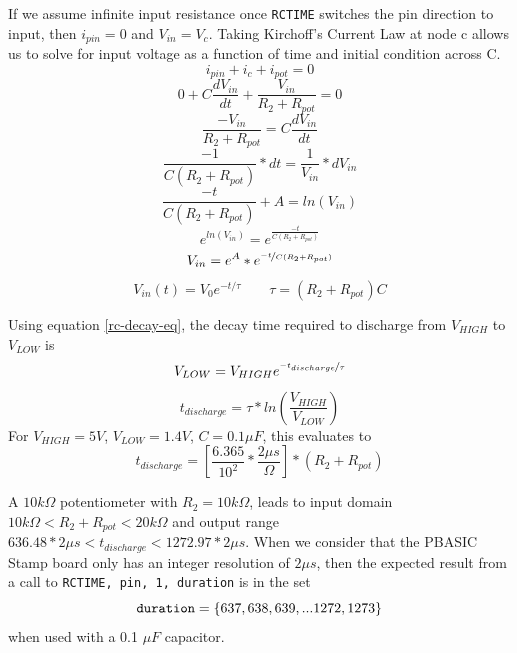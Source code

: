 \documentclass[11pt]{article}
\begin{document}
If we assume infinite input resistance once \texttt{RCTIME} switches
the pin direction to input, then $i_{pin}=0$ and $V_{in}=V_{c}$.
Taking Kirchoff's Current Law at node c allows us to solve for input
voltage as a function of time and initial condition across C.
\begin{equation*}
i_{pin}+i_{c}+i_{pot}=0
\end{equation*}
\begin{equation*}
0+C\frac{dV_{in}}{dt}+\frac{V_{in}}{R_{2}+R_{pot}}=0
\end{equation*}
\begin{equation*}
\frac{-V_{in}}{R_{2}+R_{pot}}=C\frac{dV_{in}}{dt}
\end{equation*}
\begin{equation*}
\frac{-1}{C(R_{2}+R_{pot})}*dt=\frac{1}{V_{in}}*dV_{in}
\end{equation*}
\begin{equation*}
\frac{-t}{C(R_{2}+R_{pot})}+A=ln(V_{in})
\end{equation*}
\begin{equation*}
e^{ln(V_{in})}=e^{\frac{-t}{C(R_{2}+R_{pot})}}
\end{equation*}
\begin{equation*}
V_{in}=e^{A}*e^{\nicefrac{-t}{C(R_{2}+R_{pot})}}
\end{equation*}
\begin{equation}
V_{in}(t)=V_{0}e^{-t/\tau} \quad \quad \tau=(R_{2}+R_{pot})C
\label{rc-decay-eq}
\end{equation}

Using equation \ref{rc-decay-eq}, the decay time required to discharge
from $V_{HIGH}$ to $V_{LOW}$ is
\begin{equation*}
V_{LOW}=V_{HIGH}e^{\nicefrac{-t_{discharge}}{\tau}}
\end{equation*}
\begin{equation*}
t_{discharge}=\tau*ln\left(\frac{V_{HIGH}}{V_{LOW}}\right)
\end{equation*}
For $V_{HIGH}=5V$, $V_{LOW}=1.4V$, $C=0.1\mu F$, this evaluates to
\begin{equation}
t_{discharge}=\left[\frac{6.365}{10^{2}}*\frac{2\mu s}{\Omega}\right]*(R_{2}+R_{pot})
\label{t-discharge-eq}
\end{equation}

A $10k\Omega$ potentiometer with $R_{2}=10k\Omega$, leads to input
domain $10k\Omega<R_{2}+R_{pot}<20k\Omega$ and output range
$636.48*2\mu s<t_{discharge}<1272.97*2\mu s$. When we consider
that the PBASIC Stamp board only has an integer resolution of
$2 \mu s$, then the expected result from a call to
\mbox{\texttt{RCTIME, pin, 1, duration}} is in the set
\begin{equation*}
\textrm{\texttt{duration}}=\{637, 638, 639,...1272, 1273\}
\end{equation*}
when used with a 0.1 $\mu F$ capacitor.
\end{document}
